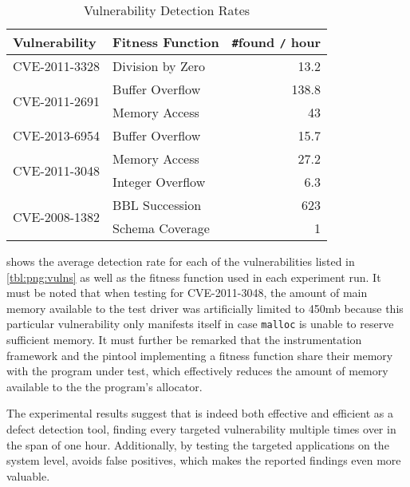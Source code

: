 \begin{table}[H]
\centering
\begin{tabular}{|l|l|r|}
\hline
Vulnerability                  & Fitness Function & \texttt\#found \texttt{/} hour \\ \hline \hline
CVE-2011-3328                  & Division by Zero & 13.2           \\ \hline \hline
\multirow{2}{*}{CVE-2011-2691} & Buffer Overflow  & 138.8          \\ \cline{2-3} 
                               & Memory Access    & 43             \\ \hline \hline
CVE-2013-6954                  & Buffer Overflow  & 15.7           \\ \hline \hline
\multirow{2}{*}{CVE-2011-3048} & Memory Access    & 27.2           \\ \cline{2-3}
							   & Integer Overflow & 6.3			   \\ \hline \hline
\multirow{2}{*}{CVE-2008-1382} & BBL Succession   & 623            \\ \cline{2-3}
                               & Schema Coverage  & 1              \\ \hline
\end{tabular}
\caption{Vulnerability Detection Rates}
\label{tbl:png:rates}
\end{table}

 shows the average detection rate for each of the vulnerabilities listed in
\cref{tbl:png:vulns} as well as the fitness function used in each experiment run. It must be noted that when
testing for {\small CVE-2011-3048}, the amount of main memory available to the test driver was artificially
limited to 450mb because this particular vulnerability only manifests itself in case \texttt{malloc} is unable
to reserve sufficient memory. It must further be remarked that the \pin instrumentation framework and the
pintool implementing a fitness function share their memory with the program under test, which effectively
reduces the amount of memory available to the the program's allocator.
 
The experimental results suggest that \xmlmate is indeed both effective and efficient as a defect detection
tool, finding every targeted vulnerability multiple times over in the span of one hour. Additionally, by
testing the targeted applications on the system level, \xmlmate avoids false positives, which makes the
reported findings even more valuable.

